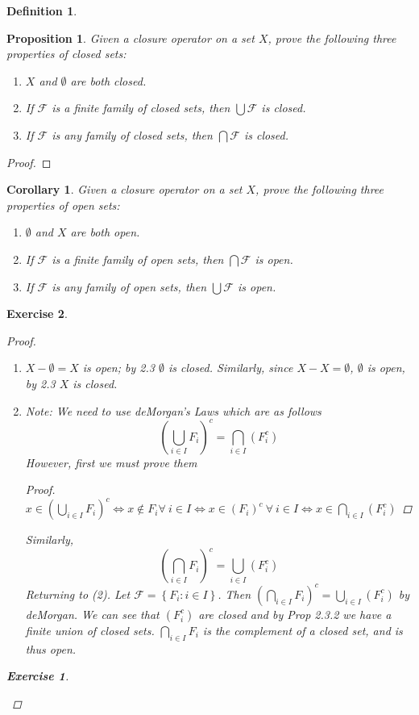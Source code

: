\documentclass[12pt]{amsart}
\newtheorem{corollary}[theorem]{Corollary}
\newtheorem{proposition}[theorem]{Proposition}
\newtheorem{exercise}{Exercise}[section]
\theoremstyle{definition}
\newtheorem{definition}[theorem]{Definition}
\theoremstyle{remark}
\newcommand{\0}{\emptyset}
\newcommand{\F}{\mathcal F}
\begin{document}
\begin{definition}
\begin{proposition}
Given a closure operator on a set $X$, prove the following three properties of closed sets:
\begin{enumerate}
\item $X$ and $\0$ are both closed.
\item If $\F$ is a finite family of closed sets, then $\bigcup \F$ is closed.
\item If $\F$ is any family of closed sets, then $\bigcap \F$ is closed.
\end{enumerate}
\end{proposition}
\begin{proof}
\end{proof}

\begin{corollary}
Given a closure operator on a set $X$, prove the following three properties of open sets:
\begin{enumerate}
\item $\0$ and $X$ are both open.
\item If $\F$ is a finite family of open sets, then $\bigcap \F$ is open.
\item If $\F$ is any family of open sets, then $\bigcup \F$ is open.
\end{enumerate}
\end{corollary}
\begin{exercise} 
\begin{proof}
	\begin{enumerate}
		\item $X- \0 = X$ is open; by 2.3 $\0$ is closed. Similarly, since $X-X=\0$, $\0$ is open, by 2.3 $X$ is closed.
		\item Note: We need to use deMorgan's Laws which are as follows
		$$\left(\bigcup_{i \in I}F_i\right)^c = \bigcap_{i \in I}\left(F_i^c\right)$$
		However, first we must prove them
		\begin{proof}
			$x \in \left(\bigcup_{i \in I}F_i\right)^c \iff x \not\in F_i \forall\: i \in I \iff x \in \left(F_i\right)^c \:\forall\: i \in I \iff x \in \bigcap_{i \in I}\left(F_i^c\right)$
		\end{proof}
		Similarly,
		$$\left(\bigcap_{i \in I}F_i\right)^c = \bigcup_{i \in I}\left(F_i^c\right)$$
		Returning to (2). Let $\F = \left\{ F_i:i \in I \right\}$. Then $\left( \bigcap_{i \in I}F_i \right)^c = \bigcup_{i \in I}\left(F_i^c\right)$ by deMorgan. We can see that $\left( F_i^c \right)$ are closed and by Prop 2.3.2 we have a finite union of closed sets. $\bigcap_{i \in I}F_i$ is the complement of a closed set, and is thus open.
	\end{enumerate}
\begin{exercise}\end{exercise}
\end{proof}


\end{exercise}
\end{definition}
\end{document}
